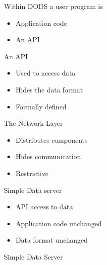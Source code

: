 %
%


\begin{slide}{}
\centerline{}
Within DODS a user program is
\begin{itemize}
\item Application code
\item An API
\end{itemize}
\end{slide}


\begin{slide}{}
An API
\begin{itemize}
\item Used to access data
\item Hides the data format
\item Formally defined
\end{itemize}
\end{slide}


\begin{slide}{}
\centerline{}
The Network Layer
\begin{itemize}
\item Distributes components
\item Hides communication
\item Restrictive
\end{itemize}
\end{slide}


\begin{slide}{}
Simple Data server
\begin{itemize}
\item API access to data
\item Application code unchanged
\item Data format unchanged
\end{itemize}
\end{slide}


\begin{slide}{}
\centerline{}
\centerline{Simple Data Server}
\end{slide}



